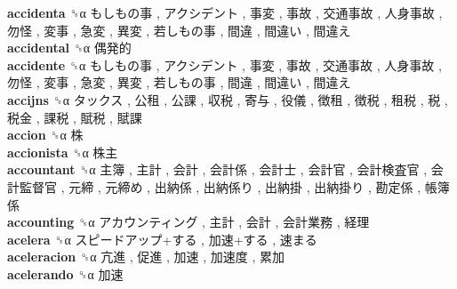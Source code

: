 \textbf{accidenta} ␝α   もしもの事 ,  アクシデント ,  事変 ,  事故 ,  交通事故 ,  人身事故 ,  勿怪 ,  変事 ,  急変 ,  異変 ,  若しもの事 ,  間違 ,  間違い ,  間違え   \\
\textbf{accidental} ␝α   偶発的   \\
\textbf{accidente} ␝α   もしもの事 ,  アクシデント ,  事変 ,  事故 ,  交通事故 ,  人身事故 ,  勿怪 ,  変事 ,  急変 ,  異変 ,  若しもの事 ,  間違 ,  間違い ,  間違え   \\
\textbf{accijns} ␝α   タックス ,  公租 ,  公課 ,  収税 ,  寄与 ,  役儀 ,  徴租 ,  徴税 ,  租税 ,  税 ,  税金 ,  課税 ,  賦税 ,  賦課   \\
\textbf{accion} ␝α   株   \\
\textbf{accionista} ␝α   株主   \\
\textbf{accountant} ␝α   主簿 ,  主計 ,  会計 ,  会計係 ,  会計士 ,  会計官 ,  会計検査官 ,  会計監督官 ,  元締 ,  元締め ,  出納係 ,  出納係り ,  出納掛 ,  出納掛り ,  勘定係 ,  帳簿係   \\
\textbf{accounting} ␝α   アカウンティング ,  主計 ,  会計 ,  会計業務 ,  経理   \\
\textbf{acelera} ␝α   スピードアップ+する ,  加速+する ,  速まる   \\
\textbf{aceleracion} ␝α   亢進 ,  促進 ,  加速 ,  加速度 ,  累加   \\
\textbf{acelerando} ␝α   加速   \\
